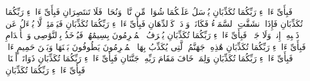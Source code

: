 \stopbuffer
\startbuffer[\q:55:34]
فَبِأَیِّ ءَالَاۤءِ رَبِّكُمَا تُكَذِّبَانِ%
\stopbuffer
\startbuffer[\q:55:35]
یُرۡسَلُ عَلَیۡكُمَا شُوَاظࣱ مِّن نَّارࣲ وَنُحَاسࣱ فَلَا تَنتَصِرَانِ%
\stopbuffer
\startbuffer[\q:55:36]
فَبِأَیِّ ءَالَاۤءِ رَبِّكُمَا تُكَذِّبَانِ%
\stopbuffer
\startbuffer[\q:55:37]
فَإِذَا ٱنشَقَّتِ ٱلسَّمَاۤءُ فَكَانَتۡ وَرۡدَةࣰ كَٱلدِّهَانِ%
\stopbuffer
\startbuffer[\q:55:38]
فَبِأَیِّ ءَالَاۤءِ رَبِّكُمَا تُكَذِّبَانِ%
\stopbuffer
\startbuffer[\q:55:39]
فَیَوۡمَئِذࣲ لَّا یُسۡءَلُ عَن ذَنۢبِهِۦۤ إِنسࣱ وَلَا جَاۤنࣱّ%
\stopbuffer
\startbuffer[\q:55:40]
فَبِأَیِّ ءَالَاۤءِ رَبِّكُمَا تُكَذِّبَانِ%
\stopbuffer
\startbuffer[\q:55:41]
یُعۡرَفُ ٱلۡمُجۡرِمُونَ بِسِیمَٰهُمۡ فَیُؤۡخَذُ بِٱلنَّوَٰصِی وَٱلۡأَقۡدَامِ%
\stopbuffer
\startbuffer[\q:55:42]
فَبِأَیِّ ءَالَاۤءِ رَبِّكُمَا تُكَذِّبَانِ%
\stopbuffer
\startbuffer[\q:55:43]
هَٰذِهِۦ جَهَنَّمُ ٱلَّتِی یُكَذِّبُ بِهَا ٱلۡمُجۡرِمُونَ%
\stopbuffer
\startbuffer[\q:55:44]
یَطُوفُونَ بَیۡنَهَا وَبَیۡنَ حَمِیمٍ ءَانࣲ%
\stopbuffer
\startbuffer[\q:55:45]
فَبِأَیِّ ءَالَاۤءِ رَبِّكُمَا تُكَذِّبَانِ%
\stopbuffer
\startbuffer[\q:55:46]
وَلِمَنۡ خَافَ مَقَامَ رَبِّهِۦ جَنَّتَانِ%
\stopbuffer
\startbuffer[\q:55:47]
فَبِأَیِّ ءَالَاۤءِ رَبِّكُمَا تُكَذِّبَانِ%
\stopbuffer
\startbuffer[\q:55:48]
ذَوَاتَاۤ أَفۡنَانࣲ%
\stopbuffer
\startbuffer[\q:55:49]
فَبِأَیِّ ءَالَاۤءِ رَبِّكُمَا تُكَذِّبَانِ%
\stopbuffer

